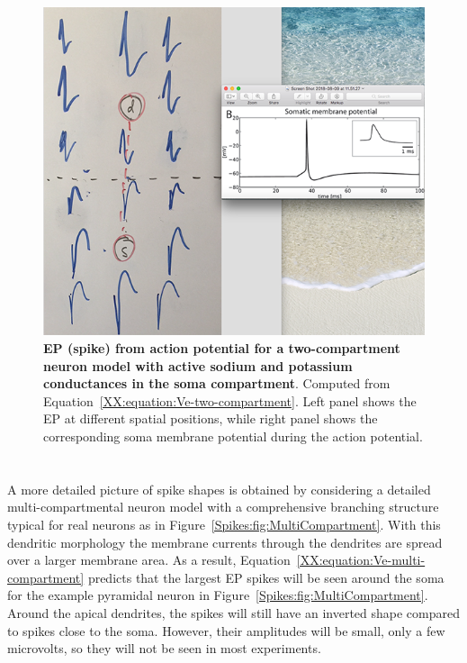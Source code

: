 \begin{figure}[!ht]
\begin{center}
\includegraphics{Figures/Spikes/Spikes-TwoCompartment-w100-r150}
\end{center}
\caption{\textbf{EP (spike) from action potential for a two-compartment neuron model with active sodium
and potassium conductances in the soma compartment}. Computed from 
Equation~\ref{XX:equation:Ve-two-compartment}.
Left panel shows the EP at different spatial positions, while right panel shows the corresponding
soma membrane potential during the action potential. 
}
\label{Spikes:fig:TwoCompartment}
\end{figure}

\section{}
\label{Spikes:sec:EP-spikes-multi-compartment}
A more detailed picture of spike shapes is obtained by considering a detailed multi-compartmental neuron model
with a comprehensive branching structure typical for real neurons as in Figure~\ref{Spikes:fig:MultiCompartment}.
With this dendritic morphology the membrane currents through the dendrites are spread over a larger membrane area.
As a result, Equation~\ref{XX:equation:Ve-multi-compartment} predicts that the largest EP spikes will be seen
around the soma for the example pyramidal neuron in Figure~\ref{Spikes:fig:MultiCompartment}.  
Around the apical dendrites, the spikes will still have an inverted shape compared to spikes close to the soma. 
However, their amplitudes will be small, only a few microvolts, so they will not be seen in most experiments.

